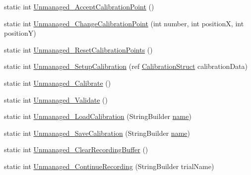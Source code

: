 \begin{DoxyCompactItemize}
\item 
static int \hyperlink{class_web_analyzer_1_1_eye_tracking_1_1_eye_tracking_controller_a1ed386739e4b8e989e3e08eaa665dafb}{Unmanaged\+\_\+\+Accept\+Calibration\+Point} ()
\item 
static int \hyperlink{class_web_analyzer_1_1_eye_tracking_1_1_eye_tracking_controller_a78e8280df5527455cc7d4eafe3a7cc31}{Unmanaged\+\_\+\+Change\+Calibration\+Point} (int number, int position\+X, int position\+Y)
\item 
static int \hyperlink{class_web_analyzer_1_1_eye_tracking_1_1_eye_tracking_controller_a8a996ed1dd5cdd9d729031cba19839b0}{Unmanaged\+\_\+\+Reset\+Calibration\+Points} ()
\item 
static int \hyperlink{class_web_analyzer_1_1_eye_tracking_1_1_eye_tracking_controller_a8cefedc555f2c8bc2ba579c34971f436}{Unmanaged\+\_\+\+Setup\+Calibration} (ref \hyperlink{struct_web_analyzer_1_1_eye_tracking_1_1_eye_tracking_controller_1_1_calibration_struct}{Calibration\+Struct} calibration\+Data)
\item 
static int \hyperlink{class_web_analyzer_1_1_eye_tracking_1_1_eye_tracking_controller_a82a74b5fc37ca9db55cce22e88f7947b}{Unmanaged\+\_\+\+Calibrate} ()
\item 
static int \hyperlink{class_web_analyzer_1_1_eye_tracking_1_1_eye_tracking_controller_ab9cabc57e75454dd06abdcfd467e0e83}{Unmanaged\+\_\+\+Validate} ()
\item 
static int \hyperlink{class_web_analyzer_1_1_eye_tracking_1_1_eye_tracking_controller_a713c2ddfbfa2c32b7e884794d5b3698c}{Unmanaged\+\_\+\+Load\+Calibration} (String\+Builder \hyperlink{_u_i_2_h_t_m_l_resources_2js_2src_2create__experiment_8js_adac2bcb4f01b574cbc63fe8ee2c56bf0}{name})
\item 
static int \hyperlink{class_web_analyzer_1_1_eye_tracking_1_1_eye_tracking_controller_ae79432f9628258506eeaec14872e5203}{Unmanaged\+\_\+\+Save\+Calibration} (String\+Builder \hyperlink{_u_i_2_h_t_m_l_resources_2js_2src_2create__experiment_8js_adac2bcb4f01b574cbc63fe8ee2c56bf0}{name})
\item 
static int \hyperlink{class_web_analyzer_1_1_eye_tracking_1_1_eye_tracking_controller_ae00bfcd4bfa4d6232215cfced5dcd003}{Unmanaged\+\_\+\+Clear\+Recording\+Buffer} ()
\item 
static int \hyperlink{class_web_analyzer_1_1_eye_tracking_1_1_eye_tracking_controller_a63aac406aeb6d8f952bb2f54b280b138}{Unmanaged\+\_\+\+Continue\+Recording} (String\+Builder trial\+Name)
\item 

\end{DoxyCompactItemize}
